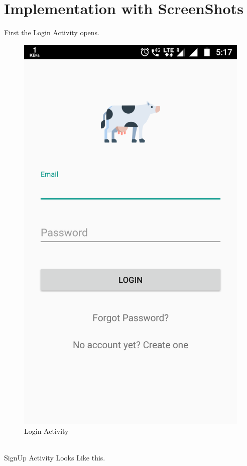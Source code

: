\section{Implementation with ScreenShots}
	First the Login Activity opens.\\
\begin{figure}[h]
	\centering
	\includegraphics[width=0.7\linewidth]{s01}
	\caption{Login Activity}
\end{figure}
\\
SignUp Activity Looks Like this.

